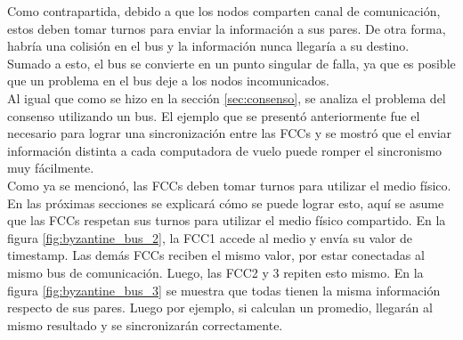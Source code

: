 Como contrapartida, debido a que los nodos comparten canal de comunicación, estos deben tomar turnos para enviar la información a sus pares. De otra forma, habría una colisión en el bus y la información nunca llegaría a su destino. Sumado a esto, el bus se convierte en un punto singular de falla, ya que es posible que un problema en el bus deje a los nodos incomunicados.\\


Al igual que como se hizo en la sección \ref{sec:consenso}, se analiza el problema del consenso utilizando un bus. El ejemplo que se presentó anteriormente fue el necesario para lograr una sincronización entre las FCCs y se mostró que el enviar información distinta a cada computadora de vuelo puede romper el sincronismo muy fácilmente.\\

Como ya se mencionó, las FCCs deben tomar turnos para utilizar el medio físico. En las próximas secciones se explicará cómo se puede lograr esto, aquí se asume que las FCCs respetan sus turnos para utilizar el medio físico compartido. En la figura \ref{fig:byzantine_bus_2}, la FCC1 accede al medio y envía su valor de timestamp. Las demás FCCs reciben el mismo valor, por estar conectadas al mismo bus de comunicación. Luego, las FCC2 y 3 repiten esto mismo. En la figura \ref{fig:byzantine_bus_3} se muestra que todas tienen la misma información respecto de sus pares. Luego por ejemplo, si calculan un promedio, llegarán al mismo resultado y se sincronizarán correctamente.

